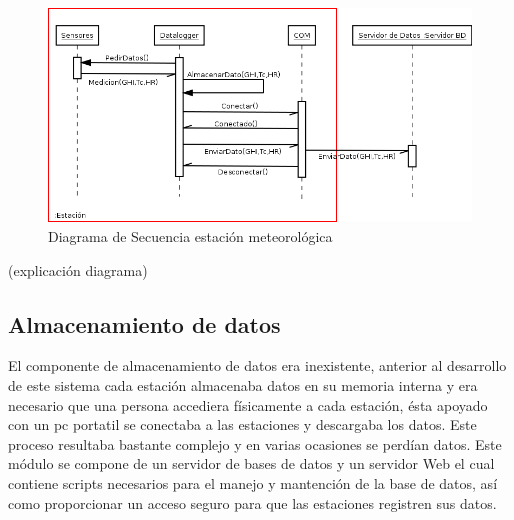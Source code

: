 {\begin{figure}[h!]
        \centering
        \includegraphics[scale=0.25]{images/estacionSecuencia}
        \caption{Diagrama de Secuencia estación meteorológica}
        \label{despliegue}
\end{figure}

(explicación diagrama)

\subsection{Almacenamiento de datos}
El componente de almacenamiento de datos era inexistente, anterior al desarrollo de este sistema cada estación almacenaba datos en su memoria interna y era necesario que una persona accediera físicamente a cada estación, ésta apoyado con un pc portatil se conectaba a las estaciones y descargaba los datos. Este proceso resultaba bastante complejo y en varias ocasiones se perdían datos. Este módulo se compone de un servidor de bases de datos y un servidor Web el cual contiene scripts necesarios para el manejo y mantención de la base de datos, así como proporcionar un acceso seguro para que las estaciones registren sus datos.\\

}

